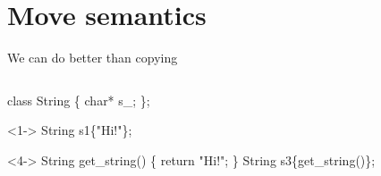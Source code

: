 
\section{Move semantics}

\begin{frame}[fragile]{We can do better than copying}

  \begin{columns}
    \begin{column}{.45\textwidth}

      \begin{codeblock}{\tiny
class String \{
  char* s\_;
  \ddd
\};}\end{codeblock}

      \begin{codeblock}<1->{\tiny
String s1\{"Hi!"\};
}\end{codeblock}


  \begin{codeblock}<4->{\tiny
String get\_string() \{ return "Hi!"; \}
String \alert<6>{s3}\{\alert<5>{get\_string()}\}\alert<7>{;}}\end{codeblock}

    \end{column}

    \begin{column}{.55\textwidth}
      \newcommand*{\stackx}{0.}
      \newcommand*{\heapx}{3.0}


\end{column}
\end{columns}
\end{frame}
